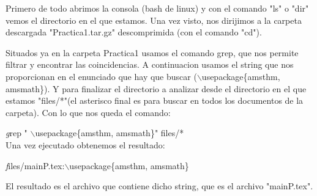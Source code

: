 \documentclass{article}
\begin{document}
Primero de todo abrimos la consola (bash de linux) y con el comando "ls" o "dir" vemos el directorio en el que estamos. 
Una vez visto, nos dirijimos a la carpeta descargada "Practica1.tar.gz" descomprimida (con el comando "cd"). 

Situados ya  en la carpeta Practica1 usamos el comando grep, que nos  permite filtrar y  encontrar las coincidencias. A continuacion usamos el string  que nos proporcionan en el  enunciado que hay que buscar ($\backslash$usepackage\{amsthm, amsmath\}).
Y para finalizar el directorio a analizar desde el directorio en el que estamos "files/*"(el asterisco final es para buscar en todos los documentos de la carpeta).
Con lo que nos queda el comando:



\emph grep " $\backslash$usepackage\{amsthm, amsmath\}" files/*
\\

Una vez ejecutado obtenemos el resultado:




\emph files/mainP.tex:$\backslash$usepackage\{amsthm, amsmath\}


El resultado es el archivo que contiene dicho string, que es el archivo "mainP.tex".
\end{document}
